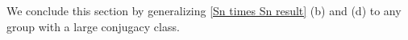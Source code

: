 \documentclass[12pt]{article}
\newtheorem{claim}{Claim}
\def\john#1{\noindent
\textcolor{green}
{\textsc{(John:}
\textsf{#1})}}
\begin{document}

We conclude this section by generalizing \autoref{Sn times Sn result} (b) and (d) to any group with a large conjugacy class.
\end{document}
